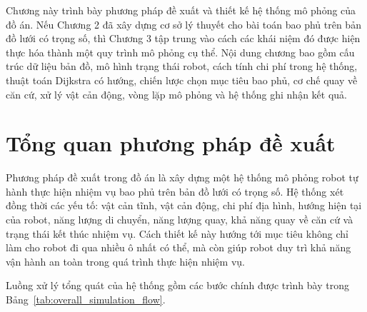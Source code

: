 \documentclass[../DoAn.tex]{subfiles}
\begin{document}
\renewcommand{\tablename}{Bảng}

Chương này trình bày phương pháp đề xuất và thiết kế hệ thống mô phỏng của đồ án. Nếu Chương 2 đã xây dựng cơ sở lý thuyết cho bài toán bao phủ trên bản đồ lưới có trọng số, thì Chương 3 tập trung vào cách các khái niệm đó được hiện thực hóa thành một quy trình mô phỏng cụ thể. Nội dung chương bao gồm cấu trúc dữ liệu bản đồ, mô hình trạng thái robot, cách tính chi phí trong hệ thống, thuật toán Dijkstra có hướng, chiến lược chọn mục tiêu bao phủ, cơ chế quay về căn cứ, xử lý vật cản động, vòng lặp mô phỏng và hệ thống ghi nhận kết quả.

\section{Tổng quan phương pháp đề xuất}

Phương pháp đề xuất trong đồ án là xây dựng một hệ thống mô phỏng robot tự hành thực hiện nhiệm vụ bao phủ trên bản đồ lưới có trọng số. Hệ thống xét đồng thời các yếu tố: vật cản tĩnh, vật cản động, chi phí địa hình, hướng hiện tại của robot, năng lượng di chuyển, năng lượng quay, khả năng quay về căn cứ và trạng thái kết thúc nhiệm vụ. Cách thiết kế này hướng tới mục tiêu không chỉ làm cho robot đi qua nhiều ô nhất có thể, mà còn giúp robot duy trì khả năng vận hành an toàn trong quá trình thực hiện nhiệm vụ.

Luồng xử lý tổng quát của hệ thống gồm các bước chính được trình bày trong Bảng~\ref{tab:overall_simulation_flow}.
\end{document}
